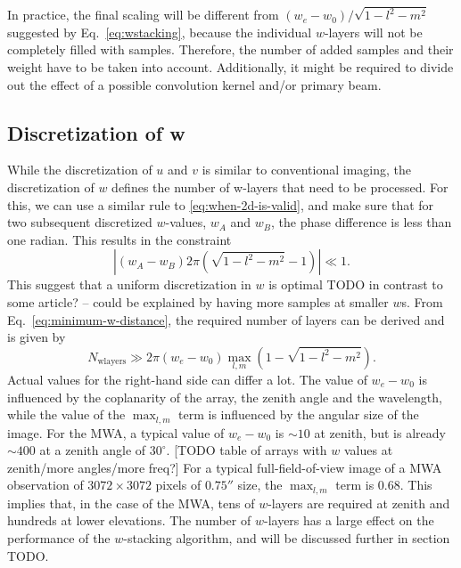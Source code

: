 \documentclass[useAMS,usenatbib]{mn2e}
\begin{document}
In practice, the final scaling will be different from $\left(w_e - w_0\right)/\sqrt{1-l^2-m^2}$ suggested by Eq.~\eqref{eq:wstacking}, because the individual $w$-layers will not be completely filled with samples. Therefore, the number of added samples and their weight have to be taken into account. Additionally, it might be required to divide out the effect of a possible convolution kernel and/or primary beam.

\subsection{Discretization of w} \label{sec:gridding-w}
While the discretization of $u$ and $v$ is similar to conventional imaging, the discretization of $w$ defines the number of w-layers that need to be processed. For this, we can use a similar rule to \eqref{eq:when-2d-is-valid}, and make sure that for two subsequent discretized $w$-values, $w_A$ and $w_B$, the phase difference is less than one radian. This results in the constraint
\begin{equation} \label{eq:minimum-w-distance}
\left|\left(w_A - w_B\right) 2\pi (\sqrt{1-l^2-m^2}-1)\right| \ll 1.
\end{equation}
This suggest that a uniform discretization in $w$ is optimal TODO in contrast to some article? -- could be explained by having more samples at smaller $w$s. From Eq.~\eqref{eq:minimum-w-distance}, the required number of layers can be derived and is given by
\begin{equation}
 N_\textrm{wlayers} \gg 2\pi \left(w_e - w_0\right) \max_{l,m} \left(1 - \sqrt{1-l^2-m^2}\right).
\end{equation}
Actual values for the right-hand side can differ a lot. The value of $w_e - w_0$ is influenced by the coplanarity of the array, the zenith angle and the wavelength, while the value of the $\max_{l,m}$ term is influenced by the angular size of the image. For the MWA, a typical value of $w_e - w_0$ is $\sim 10$ at zenith, but is already $\sim 400$ at a zenith angle of $30^{\circ}$. [TODO table of arrays with $w$ values at zenith/more angles/more freq?] For a typical full-field-of-view image of a MWA observation of $3072\times 3072$ pixels of $0.75''$ size, the $\max_{l,m}$ term is $0.68$. This implies that, in the case of the MWA, tens of $w$-layers are required at zenith and hundreds at lower elevations. The number of $w$-layers has a large effect on the performance of the $w$-stacking algorithm, and will be discussed further in section TODO.
\end{document}
